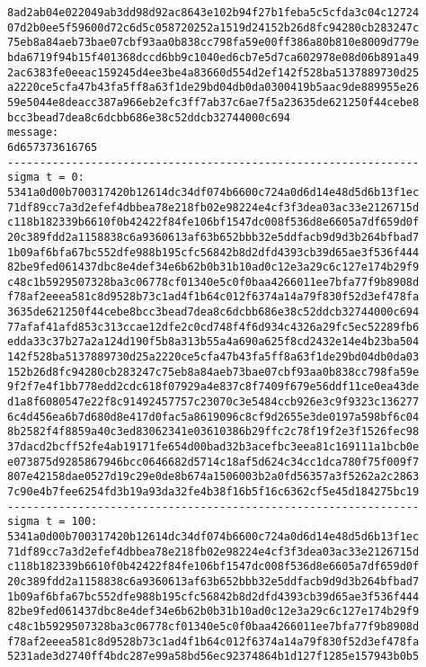 \documentclass{article}
\begin{document}
{\begin{verbatim}
8ad2ab04e022049ab3dd98d92ac8643e102b94f27b1feba5c5cfda3c04c12724
07d2b0ee5f59600d72c6d5c058720252a1519d24152b26d8fc94280cb283247c
75eb8a84aeb73bae07cbf93aa0b838cc798fa59e00ff386a80b810e8009d779e
bda6719f94b15f401368dccd6bb9c1040ed6cb7e5d7ca602978e08d06b891a49
2ac6383fe0eeac159245d4ee3be4a83660d554d2ef142f528ba5137889730d25
a2220ce5cfa47b43fa5ff8a63f1de29bd04db0da0300419b5aac9de889955e26
59e5044e8deacc387a966eb2efc3ff7ab37c6ae7f5a23635de621250f44cebe8
bcc3bead7dea8c6dcbb686e38c52ddcb32744000c694
message:
6d657373616765
----------------------------------------------------------------
sigma t = 0:
5341a0d00b700317420b12614dc34df074b6600c724a0d6d14e48d5d6b13f1ec
71df89cc7a3d2efef4dbbea78e218fb02e98224e4cf3f3dea03ac33e2126715d
c118b182339b6610f0b42422f84fe106bf1547dc008f536d8e6605a7df659d0f
20c389fdd2a1158838c6a9360613af63b652bbb32e5ddfacb9d9d3b264bfbad7
1b09af6bfa67bc552dfe988b195cfc56842b8d2dfd4393cb39d65ae3f536f444
82be9fed061437dbc8e4def34e6b62b0b31b10ad0c12e3a29c6c127e174b29f9
c48c1b5929507328ba3c06778cf01340e5c0f0baa4266011ee7bfa77f9b8908d
f78af2eeea581c8d9528b73c1ad4f1b64c012f6374a14a79f830f52d3ef478fa
3635de621250f44cebe8bcc3bead7dea8c6dcbb686e38c52ddcb32744000c694
77afaf41afd853c313ccae12dfe2c0cd748f4f6d934c4326a29fc5ec52289fb6
edda33c37b27a2a124d190f5b8a313b55a4a690a625f8cd2432e14e4b23ba504
142f528ba5137889730d25a2220ce5cfa47b43fa5ff8a63f1de29bd04db0da03
152b26d8fc94280cb283247c75eb8a84aeb73bae07cbf93aa0b838cc798fa59e
9f2f7e4f1bb778edd2cdc618f07929a4e837c8f7409f679e56ddf11ce0ea43de
d1a8f6080547e22f8c91492457757c23070c3e5484ccb926e3c9f9323c136277
6c4d456ea6b7d680d8e417d0fac5a8619096c8cf9d2655e3de0197a598bf6c04
8b2582f4f8859a40c3ed83062341e03610386b29ffc2c78f19f2e3f1526fec98
37dacd2bcff52fe4ab19171fe654d00bad32b3acefbc3eea81c169111a1bcb0e
e073875d9285867946bcc0646682d5714c18af5d624c34cc1dca780f75f009f7
807e42158dae0527d19c29e0de8b674a1506003b2a0fd56357a3f5262a2c2863
7c90e4b7fee6254fd3b19a93da32fe4b38f16b5f16c6362cf5e45d184275bc19
----------------------------------------------------------------
sigma t = 100:
5341a0d00b700317420b12614dc34df074b6600c724a0d6d14e48d5d6b13f1ec
71df89cc7a3d2efef4dbbea78e218fb02e98224e4cf3f3dea03ac33e2126715d
c118b182339b6610f0b42422f84fe106bf1547dc008f536d8e6605a7df659d0f
20c389fdd2a1158838c6a9360613af63b652bbb32e5ddfacb9d9d3b264bfbad7
1b09af6bfa67bc552dfe988b195cfc56842b8d2dfd4393cb39d65ae3f536f444
82be9fed061437dbc8e4def34e6b62b0b31b10ad0c12e3a29c6c127e174b29f9
c48c1b5929507328ba3c06778cf01340e5c0f0baa4266011ee7bfa77f9b8908d
f78af2eeea581c8d9528b73c1ad4f1b64c012f6374a14a79f830f52d3ef478fa
5231ade3d2740ff4bdc287e99a58bd56ec92374864b1d127f1285e157943b0b5

\end{verbatim}}
\end{document}
